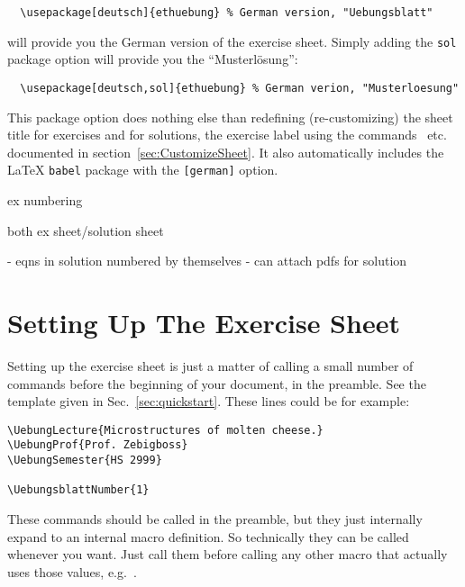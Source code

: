 \documentclass[11pt,a4paper]{article}
\begin{document}
\begin{pkgverbatim}
\begin{verbatim}
  \usepackage[deutsch]{ethuebung} % German version, "Uebungsblatt"
\end{verbatim}
\end{pkgverbatim}
will provide you the German version of the exercise sheet. Simply adding the \texttt{sol}
package option will provide you the ``Musterl\"osung'':
\begin{pkgverbatim}
\begin{verbatim}
  \usepackage[deutsch,sol]{ethuebung} % German verion, "Musterloesung"
\end{verbatim}
\end{pkgverbatim}

\begin{pkgtip}
  This package option does nothing else than redefining (re-customizing) the sheet title
  for exercises and for solutions, the exercise label using the
  commands~ etc. documented in
  section~\ref{sec:CustomizeSheet}. It also automatically includes the \LaTeX{}
  \texttt{babel} package with the \texttt{[german]} option.
\end{pkgtip}



ex numbering

both ex sheet/solution sheet

  - eqns in solution numbered by themselves
  - can attach pdfs for solution


\section{Setting Up The Exercise Sheet}
\label{sec:SetupSheet}

Setting up the exercise sheet is just a matter of calling a small number of commands
before the beginning of your document, in the preamble. See the template given in
Sec.~\ref{sec:quickstart}. These lines could be for example:
\begin{pkgverbatim}
\begin{verbatim}
\UebungLecture{Microstructures of molten cheese.}
\UebungProf{Prof. Zebigboss}
\UebungSemester{HS 2999}

\UebungsblattNumber{1}
\end{verbatim}
\end{pkgverbatim}

\begin{pkgtip}
These commands should be called in the preamble, but they just internally expand to an
internal macro definition. So technically they can be called whenever you want. Just call
them before calling any other macro that actually uses those values,
e.g.~.
\end{pkgtip}
\end{document}
